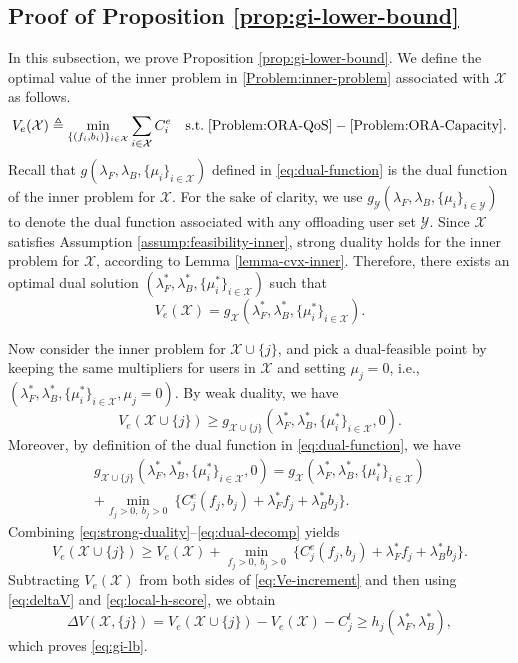\documentclass[lettersize,journal]{IEEEtran}
\begin{document}
\subsection{Proof of Proposition \ref{prop:gi-lower-bound}}\label{proof:gi-lb}
In this subsection, we prove Proposition \ref{prop:gi-lower-bound}.
We define the optimal value of the inner problem in \eqref{Problem:inner-problem} associated with $\mathcal{X}$ as follows.
\begin{align}
    V_e(\mathcal{X})\triangleq\min_{\{(f_i,b_i)\}_{i\in\mathcal{X}}}\sum_{i\in\mathcal{X}}C^e_i\quad\text{s.t.}\;\eqref{Problem:ORA-QoS}-\eqref{Problem:ORA-Capacity}.
\end{align}
Recall that $g(\lambda_F,\lambda_B,\{\mu_i\}_{i\in\mathcal{X}})$ defined in \eqref{eq:dual-function} is the dual function of the inner problem for $\mathcal{X}$. For the sake of clarity, we use $g_{\mathcal{Y}}(\lambda_F,\lambda_B,\{\mu_i\}_{i\in\mathcal{Y}})$ to denote the dual function associated with any offloading user set $\mathcal{Y}$. Since $\mathcal{X}$ satisfies Assumption \ref{assump:feasibility-inner}, strong duality holds for the inner problem for $\mathcal{X}$, according to Lemma \ref{lemma-cvx-inner}.
Therefore, there exists an optimal dual solution
$(\lambda_F^*,\lambda_B^*,\{\mu_i^*\}_{i\in\mathcal{X}})$ such that
\begin{equation}
V_e(\mathcal{X}) = g_{\mathcal{X}}(\lambda_F^*,\lambda_B^*,\{\mu_i^*\}_{i\in\mathcal{X}}).
\label{eq:strong-duality}
\end{equation}

Now consider the inner problem for $\mathcal{X}\cup\{j\}$, and pick a dual-feasible point
by keeping the same multipliers for users in $\mathcal{X}$ and setting $\mu_j=0$, i.e.,
$(\lambda_F^*,\lambda_B^*,\{\mu_i^*\}_{i\in\mathcal{X}},\mu_j=0)$.
By weak duality, we have
\begin{equation}
V_e(\mathcal{X}\cup\{j\})
\ge
g_{\mathcal{X}\cup\{j\}}(\lambda_F^*,\lambda_B^*,\{\mu_i^*\}_{i\in\mathcal{X}},0).
\label{eq:weak-duality}
\end{equation}
Moreover, by definition of the dual function in \eqref{eq:dual-function}, we have
\begin{align} 
g_{\mathcal{X}\cup\{j\}}(\lambda_F^*,\lambda_B^*,\{\mu_i^*\}_{i\in\mathcal{X}},0) = g_{\mathcal{X}}(\lambda_F^*,\lambda_B^*,\{\mu_i^*\}_{i\in\mathcal{X}}) \nonumber\\ + \min_{f_j>0,\ b_j>0}\ \big\{ C_j^e(f_j,b_j)+\lambda_F^* f_j+\lambda_B^* b_j\big\}. \label{eq:dual-decomp} \end{align}
Combining \eqref{eq:strong-duality}--\eqref{eq:dual-decomp} yields
\begin{equation}
V_e(\mathcal{X}\cup\{j\})
\ge
V_e(\mathcal{X})
+ \min_{f_j>0,\ b_j>0}\ \big\{ C_j^e(f_j,b_j)+\lambda_F^* f_j+\lambda_B^* b_j\big\}.
\label{eq:Ve-increment}
\end{equation}
Subtracting $V_e(\mathcal{X})$ from both sides of \eqref{eq:Ve-increment} and then using
\eqref{eq:deltaV} and \eqref{eq:local-h-score}, we obtain
\[
\Delta V(\mathcal{X},\{j\})
=
V_e(\mathcal{X}\cup\{j\})-V_e(\mathcal{X})-C_j^l
\ge
h_j(\lambda_F^*,\lambda_B^*),
\]
which proves \eqref{eq:gi-lb}.
\end{document}
